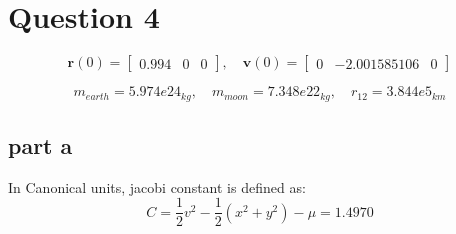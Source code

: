 \section{Question 4}
$$
\boldsymbol r(0) = \begin{bmatrix}
    0.994 & 0 & 0
\end{bmatrix}, \quad \boldsymbol v(0) = \begin{bmatrix}
    0 & -2.001585106 & 0
\end{bmatrix}
$$

$$
m_{earth} = 5.974e24_{kg}, \quad m_{moon} = 7.348e22_{kg}, \quad r_{12} = 3.844e5_{km}
$$
\subsection{part a}
In Canonical units, jacobi constant is defined as:
$$
C = \dfrac12 v^2 - \dfrac12(x^2 + y^2) - \mu = 1.4970
$$